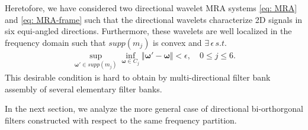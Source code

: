 

Heretofore, we have considered two directional wavelet MRA systems \eqref{eq: MRA} and \eqref{eq: MRA-frame} such that the directional wavelets characterize 2D signals in six equi-angled directions. 
Furthermore, these wavelets are well localized in the frequency domain such that $supp(m_j)$ is convex and $\exists\,\epsilon\, s.t.$
\begin{align}\label{eq: no-alians}
 \sup_{\boldsymbol{\omega}'\in supp(m_j)}\inf_{\boldsymbol{\omega}\in C_j}\Vert\boldsymbol{\omega'} - \boldsymbol{\omega}\Vert < \epsilon,\quad  0\leq j\leq 6.
\end{align}
This desirable condition is hard to obtain by multi-directional filter bank assembly of several elementary filter banks.

In the next section, we analyze the more general case of directional bi-orthorgonal filters constructed with respect to the same frequency partition. 